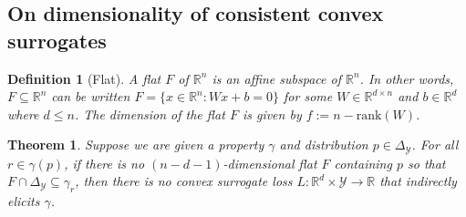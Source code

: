 \documentclass{article}
\newcommand{\reals}{\mathbb{R}}
\newcommand{\simplex}{\Delta_\Y}
\newcommand{\Y}{\mathcal{Y}}
\newtheorem{theorem}{Theorem}
\newtheorem{definition}{Definition}
\begin{document}
\subsection{On dimensionality of consistent convex surrogates}
\begin{definition}[Flat]
	A \emph{flat} $F$ of $\reals^n$ is an affine subspace of $\reals^n$.
	In other words, $F\subseteq \reals^n$ can be written $F=\{x\in\reals^n : Wx + b = 0\}$ for some $W\in\reals^{d\times n}$ and $b\in\reals^d$ where $d\leq n$.
	The dimension of the flat $F$ is given by $f := n - \mathrm{rank}(W)$.
\end{definition}

\begin{theorem}\label{thm:cvx-flats}
	Suppose we are given a property $\gamma$ and distribution $p \in \simplex$.
	For all $r\in\gamma(p)$, if there is no $(n - d-1)$-dimensional flat $F$ containing $p$ so that $F \cap \simplex \subseteq \gamma_r$, then there is no convex surrogate loss $L : \reals^d \times \Y \to \reals$ that indirectly elicits $\gamma$.
\end{theorem}
\end{document}
